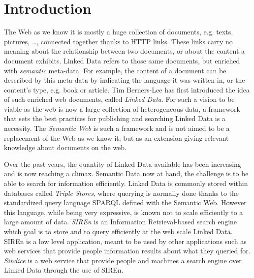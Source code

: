 \chapter{Introduction}{
The Web as we know it is mostly a huge collection of documents, e.g. texts,
pictures, \ldots, connected together thanks to HTTP links.
These links carry no meaning about the
relationship between two documents, or about the content a document exhibits.
Linked Data refers to those same documents, but enriched with \emph{semantic}
meta-data. For example, the content of a document can be described by this
meta-data by indicating the language it was written in, or the content's type,
e.g. book or article. Tim Berners-Lee has first introduced the idea of such
enriched web documents, called \emph{Linked Data}. For such a vision to be
viable as the web is now a large collection of heterogeneous data, a framework
that sets the best practices for publishing and searching Linked Data is a
necessity. The \emph{Semantic Web} is such a framework and is not aimed to be a
replacement of the Web as we know it, but as an extension giving relevant
knowledge about documents on the web.
\linebreak

Over the past years, the quantity of Linked Data available has been increasing
and is now reaching a climax. Semantic Data now at hand, the challenge is to be
able to search for information efficiently. Linked Data is commonly stored
within databases called \emph{Triple Stores}, where querying is normally done
thanks to the standardized query language SPARQL defined with the Semantic Web.
However this language, while being very expressive, is known not to scale
efficiently to a large amount of data. \emph{SIREn} is an Information
Retrieval-based search engine which goal is to store and to query efficiently
at the web scale Linked Data. SIREn is a low level application, meant to be
used by other applications such as web services that provide people
information results about what they queried for. \emph{Sindice} is a web
service that provide people and machines a search engine over Linked Data
through the use of SIREn.
\linebreak

}

